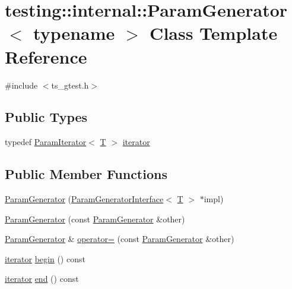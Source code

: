 \hypertarget{classtesting_1_1internal_1_1ParamGenerator}{\section{testing\-:\-:internal\-:\-:Param\-Generator$<$ typename $>$ Class Template Reference}
\label{classtesting_1_1internal_1_1ParamGenerator}
}


{\ttfamily \#include $<$ts\-\_\-gtest.\-h$>$}

\subsection*{Public Types}
\begin{DoxyCompactItemize}
\item 
typedef \hyperlink{classtesting_1_1internal_1_1ParamIterator}{Param\-Iterator}$<$ \hyperlink{calib3d_8hpp_a3efb9551a871ddd0463079a808916717}{T} $>$ \hyperlink{classtesting_1_1internal_1_1ParamGenerator_ae54d0fb888817da53218c680919262fb}{iterator}
\end{DoxyCompactItemize}
\subsection*{Public Member Functions}
\begin{DoxyCompactItemize}
\item 
\hyperlink{classtesting_1_1internal_1_1ParamGenerator_a53baf7eea2ea7078739f3a9f36c1361f}{Param\-Generator} (\hyperlink{classtesting_1_1internal_1_1ParamGeneratorInterface}{Param\-Generator\-Interface}$<$ \hyperlink{calib3d_8hpp_a3efb9551a871ddd0463079a808916717}{T} $>$ $\ast$impl)
\item 
\hyperlink{classtesting_1_1internal_1_1ParamGenerator_a5354b8979a0628996b144fcf864672d4}{Param\-Generator} (const \hyperlink{classtesting_1_1internal_1_1ParamGenerator}{Param\-Generator} \&other)
\item 
\hyperlink{classtesting_1_1internal_1_1ParamGenerator}{Param\-Generator} \& \hyperlink{classtesting_1_1internal_1_1ParamGenerator_a98cb121143b7ea2d9d7a750ccacb9e36}{operator=} (const \hyperlink{classtesting_1_1internal_1_1ParamGenerator}{Param\-Generator} \&other)
\item 
\hyperlink{classtesting_1_1internal_1_1ParamGenerator_ae54d0fb888817da53218c680919262fb}{iterator} \hyperlink{classtesting_1_1internal_1_1ParamGenerator_a6e54952b34a229d47ade26aa71f15b2f}{begin} () const 
\item 
\hyperlink{classtesting_1_1internal_1_1ParamGenerator_ae54d0fb888817da53218c680919262fb}{iterator} \hyperlink{classtesting_1_1internal_1_1ParamGenerator_a06dae4191027f4e5f9f1ca4d9a5caa2f}{end} () const 
\end{DoxyCompactItemize}


